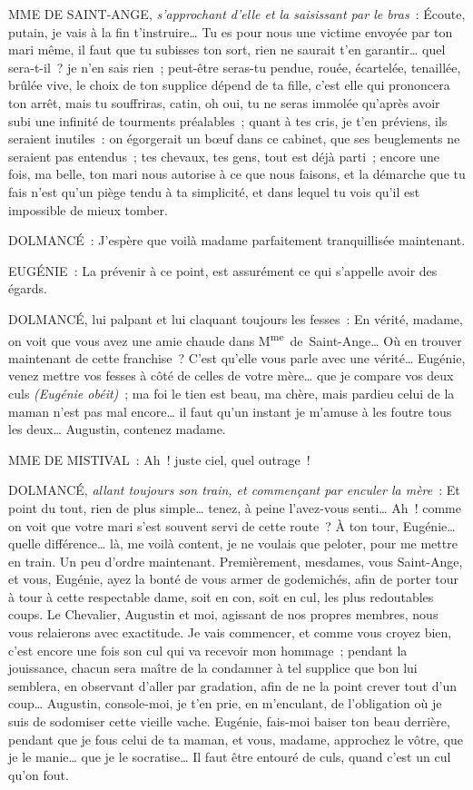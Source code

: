 \documentclass[french,twoside]{book} %
\begin{document}
MME DE SAINT-ANGE, {\itshape s’approchant d’elle et la saisissant par le bras} : Écoute, putain, je vais à la fin t’instruire… Tu es pour nous une victime envoyée par ton mari même, il faut que tu subisses ton sort, rien ne saurait t’en garantir… quel sera-t-il ? je n’en sais rien ; peut-être seras-tu pendue, rouée, écartelée, tenaillée, brûlée vive, le choix de ton supplice dépend de ta fille, c’est elle qui prononcera ton arrêt, mais tu souffriras, catin, oh oui, tu ne seras immolée qu’après avoir subi une infinité de tourments préalables ; quant à tes cris, je t’en préviens, ils seraient inutiles : on égorgerait un bœuf dans ce cabinet, que ses beuglements ne seraient pas entendus ; tes chevaux, tes gens, tout est déjà parti ; encore une fois, ma belle, ton mari nous autorise à ce que nous faisons, et la démarche que tu fais n’est qu’un piège tendu à ta simplicité, et dans lequel tu vois qu’il est impossible de mieux tomber.\par
DOLMANCÉ : J’espère que voilà madame parfaitement tranquillisée maintenant.\par
EUGÉNIE : La prévenir à ce point, est assurément ce qui s’appelle avoir des égards.\par
DOLMANCÉ, lui palpant et lui claquant toujours les fesses : En vérité, madame, on voit que vous avez une amie chaude dans M\textsuperscript{me} de Saint-Ange… Où en trouver maintenant de cette franchise ? C’est qu’elle vous parle avec une vérité… Eugénie, venez mettre vos fesses à côté de celles de votre mère… que je compare vos deux culs {\itshape (Eugénie obéit)} ; ma foi le tien est beau, ma chère, mais pardieu celui de la maman n’est pas mal encore… il faut qu’un instant je m’amuse à les foutre tous les deux… Augustin, contenez madame.\par
MME DE MISTIVAL : Ah ! juste ciel, quel outrage !\par
DOLMANCÉ, {\itshape allant toujours son train, et commençant par enculer la mère} : Et point du tout, rien de plus simple… tenez, à peine l’avez-vous senti… Ah ! comme on voit que votre mari s’est souvent servi de cette route ? À ton tour, Eugénie… quelle différence… là, me voilà content, je ne voulais que peloter, pour me mettre en train. Un peu d’ordre maintenant. Premièrement, mesdames, vous Saint-Ange, et vous, Eugénie, ayez la bonté de vous armer de godemichés, afin de porter tour à tour à cette respectable dame, soit en con, soit en cul, les plus redoutables coups. Le Chevalier, Augustin et moi, agissant de nos propres membres, nous vous relaierons avec exactitude. Je vais commencer, et comme vous croyez bien, c’est encore une fois son cul qui va recevoir mon hommage ; pendant la jouissance, chacun sera maître de la condamner à tel supplice que bon lui semblera, en observant d’aller par gradation, afin de ne la point crever tout d’un coup… Augustin, console-moi, je t’en prie, en m’enculant, de l’obligation où je suis de sodomiser cette vieille vache. Eugénie, fais-moi baiser ton beau derrière, pendant que je fous celui de ta maman, et vous, madame, approchez le vôtre, que je le manie… que je le socratise… Il faut être entouré de culs, quand c’est un cul qu’on fout.\par
\end{document}
